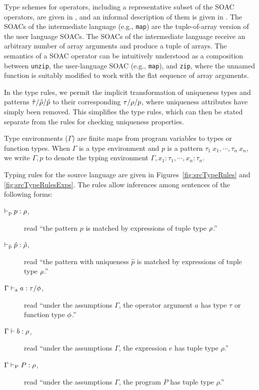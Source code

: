 Type schemes for operators, including a representative subset of the
SOAC operators, are given in , and an
informal description of them is given in .
The SOACs of the intermediate language (e.g., \lstinline{map}) are the
tuple-of-array version of the user language SOACs. The SOACs of the
intermediate language receive an arbitrary number of array arguments
and produce a tuple of arrays. The semantics of a SOAC operator can be
intuitively understood as a composition between \lstinline{unzip}, the
user-language SOAC (e.g., \lstinline{map}), and \lstinline{zip}, where the
unnamed function is suitably modified to work with the flat sequence
of array arguments.

In the type rules, we permit the implicit transformation of uniqueness
types and patterns $\hat{\tau}/\hat{\rho}/\hat{p}$ to their corresponding
$\tau/\rho/p$, where uniqueness attributes have simply been removed.
This simplifies the type rules, which can then be stated separate from
the rules for checking uniqueness properties.

Type environments ($\Gamma$) are finite
maps from program variables to types or function types. When $\Gamma$
is a type environment and $p$ is a pattern
$\tau_1~x_1,\cdots,\tau_n~x_n$, we write $\Gamma,p$ to denote the
typing environment $\Gamma,x_1:\tau_1,\cdots,x_n:\tau_n$.

Typing rules for the source language are given in
Figures~\ref{fig:srcTypeRules} and \ref{fig:srcTypeRulesExps}.  The
rules allow inferences among sentences of the following forms:

\begin{description}
\item[$\vdash_\textrm{p} p : \rho$,] read ``the pattern $p$ is matched by
  expressions of tuple type $\rho$.''
\item[$\vdash_{\hat{\textrm{p}}} \hat{p} : \hat{\rho}$,] read ``the pattern with uniqueness
  $\hat{p}$ is matched by expressions of tuple type $\rho$.''
\item[$\Gamma \vdash_\textrm{a} a : \tau / \phi$,] read ``under the assumptions
$\Gamma$, the operator argument $a$ has type $\tau$ or function type
$\phi$.''
\item[$\Gamma \vdash b : \rho$,] read ``under the assumptions $\Gamma$,
  the expression $e$ has tuple type $\rho$.''
\item[$\Gamma \vdash_\textrm{P} P : \rho$,] read ``under the assumptions
$\Gamma$, the program $P$ has tuple type $\rho$.''
\end{description}

